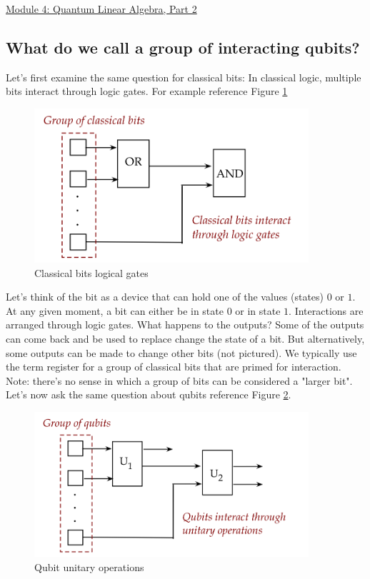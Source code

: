 \documentclass[main.tex]{subfiles}
\begin{document}
\href{https://www2.seas.gwu.edu/~simhaweb/quantum/modules/module4/module4.html}{Module 4: Quantum Linear Algebra, Part 2}

\subsection{What do we call a group of interacting qubits?}
    Let's first examine the same question for classical bits: In classical logic, multiple bits interact through logic gates. For example reference Figure \ref{fig:01bits}
    
    \begin{figure}
        \centering
        \includegraphics[width=4in]{notes/figs/n06/01bits.png}
        \caption{Classical bits logical gates}
        \label{fig:01bits}
    \end{figure}  
    
    Let's think of the bit as a device that can hold one of the values (states) 0 or $1 .$ At any given moment, a bit can either be in state 0 or in state $1 .$ Interactions are arranged through logic gates. What happens to the outputs? Some of the outputs can come back and be used to replace change the state of a bit. But alternatively, some outputs can be made to change other bits (not pictured). We typically use the term register for a group of classical bits that are primed for interaction. Note: there's no sense in which a group of bits can be considered a "larger bit". Let's now ask the same question about qubits reference Figure \ref{fig:02bits2}.
    
    \begin{figure}
        \centering
        \includegraphics[width=4in]{notes/figs/n06/02bits2.png}
        \caption{Qubit unitary operations}
        \label{fig:02bits2}
    \end{figure} 
    
\end{document}
